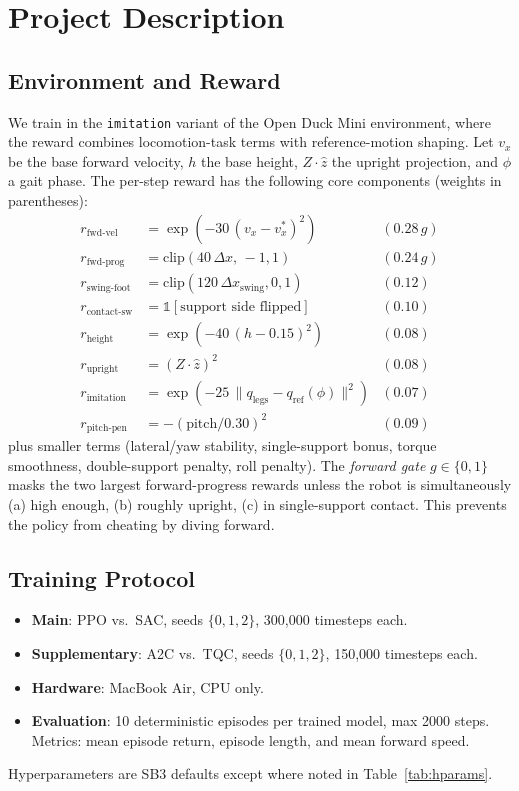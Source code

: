 \documentclass[letterpaper]{article}
\begin{document}
\section{Project Description}

\subsection{Environment and Reward}
We train in the \texttt{imitation} variant of the Open Duck Mini environment, where the reward combines locomotion-task terms with reference-motion shaping. Let $v_x$ be the base forward velocity, $h$ the base height, $Z\cdot\hat{z}$ the upright projection, and $\phi$ a gait phase.
The per-step reward has the following core components (weights in parentheses):
{\small
\begin{align*}
r_{\text{fwd-vel}} &= \exp(-30\,(v_x - v_x^*)^2) & (0.28\,g) \\
r_{\text{fwd-prog}} &= \text{clip}(40\,\Delta x,\,-1,1) & (0.24\,g) \\
r_{\text{swing-foot}} &= \text{clip}(120\,\Delta x_{\text{swing}},0,1) & (0.12) \\
r_{\text{contact-sw}} &= \mathbb{1}[\text{support side flipped}] & (0.10) \\
r_{\text{height}} &= \exp(-40\,(h-0.15)^2) & (0.08) \\
r_{\text{upright}} &= (Z\cdot\hat{z})^2 & (0.08) \\
r_{\text{imitation}} &= \exp(-25\,\lVert q_{\text{legs}}-q_{\text{ref}}(\phi)\rVert^2) & (0.07) \\
r_{\text{pitch-pen}} &= -(\text{pitch}/0.30)^2 & (0.09)
\end{align*}
}
plus smaller terms (lateral/yaw stability, single-support bonus, torque smoothness, double-support penalty, roll penalty). The \emph{forward gate} $g\in\{0,1\}$ masks the two largest forward-progress rewards unless the robot is simultaneously (a) high enough, (b) roughly upright, (c) in single-support contact. This prevents the policy from cheating by diving forward.

\subsection{Training Protocol}
\begin{itemize}
\item \textbf{Main}: PPO vs.\ SAC, seeds $\{0,1,2\}$, 300{,}000 timesteps each.
\item \textbf{Supplementary}: A2C vs.\ TQC, seeds $\{0,1,2\}$, 150{,}000 timesteps each.
\item \textbf{Hardware}: MacBook Air, CPU only.
\item \textbf{Evaluation}: 10 deterministic episodes per trained model, max 2000 steps. Metrics: mean episode return, episode length, and mean forward speed.
\end{itemize}
Hyperparameters are SB3 defaults except where noted in Table~\ref{tab:hparams}.
\end{document}
